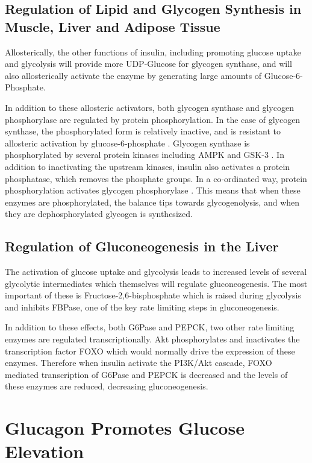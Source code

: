 \documentclass{tufte-handout}
\begin{document}
\subsection{Regulation of Lipid and Glycogen Synthesis in Muscle, Liver and Adipose Tissue}

Allosterically, the other functions of insulin, including promoting glucose uptake and glycolysis will provide more UDP-Glucose for glycogen synthase, and will also allosterically activate the enzyme by generating large amounts of Glucose-6-Phosphate.  

In addition to these allosteric activators, both glycogen synthase and glycogen phosphorylase are regulated by protein phosphorylation.  In the case of glycogen synthase, the phosphorylated form is relatively inactive, and is resistant to allosteric activation by glucose-6-phosphate \cite{Friedman1963}.  Glycogen synthase is phosphorylated by several protein kinases including AMPK and GSK-3 \cite{Parker1982}.  In addition to inactivating the upstream kinases, insulin also activates a protein phosphatase, which removes the phosphate groups.  In a co-ordinated way, protein phosphorylation activates glycogen phosphorylase \cite{Krebs1964}.  This means that when these enzymes are phosphorylated, the balance tips towards glycogenolysis, and when they are dephosphorylated glycogen is synthesized.

\subsection{Regulation of Gluconeogenesis in the Liver}

The activation of glucose uptake and glycolysis leads to increased levels of several glycolytic intermediates which themselves will regulate gluconeogenesis.  The most important of these is Fructose-2,6-bisphosphate which is raised during glycolysis and inhibits FBPase, one of the key rate limiting steps in gluconeogenesis.

In addition to these effects, both G6Pase and PEPCK, two other rate limiting enzymes are regulated transcriptionally.  Akt phosphorylates and inactivates the transcription factor FOXO which would normally drive the expression of these enzymes.  Therefore when insulin activate the PI3K/Akt cascade, FOXO mediated transcription of G6Pase and PEPCK is decreased and the levels of these enzymes are reduced, decreasing gluconeogenesis.

\section{Glucagon Promotes Glucose Elevation}
\end{document}
